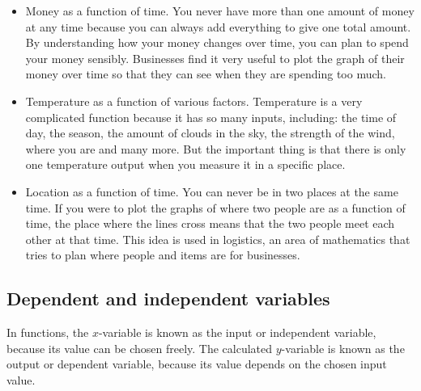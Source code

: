 \begin{itemize}[itemsep=3pt]
\item Money as a function of time. You never have more than one amount of money at any time because you can always add everything to give one total amount. By understanding how your money changes over time, you can plan to spend your money sensibly. Businesses find it very useful to plot the graph of their money over time so that they can see when they are spending too much. %
\item Temperature as a function of various factors. Temperature is a very complicated function because it has so many inputs, including: the time of day, the season, the amount of clouds in the sky, the strength of the wind, where you are and many more. But the important thing is that there is only one temperature output when you measure it in a specific place. %
\item Location as a function of time. You can never be in two places at the same time. If you were to plot the graphs of where two people are as a function of time, the place where the lines cross means that the two people meet each other at that time. This idea is used in logistics, an area of mathematics that tries to plan where people and items are for businesses.
\end{itemize}
\par


\subsection*{Dependent and independent variables}
In functions, the $x$-variable is known as the input or independent variable, because its value can be chosen freely. The calculated $y$-variable is known as the output or dependent variable, because its value depends on the chosen input value.\par 


